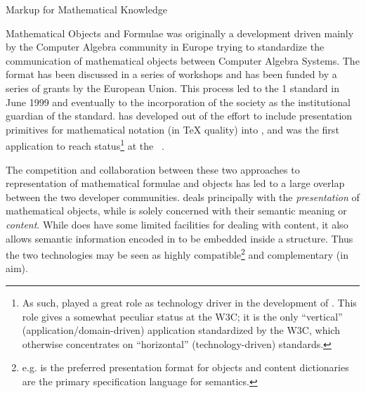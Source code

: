 \begin{tchapter}[id=math-markup]{Markup for Mathematical Knowledge}
\begin{tsection}[id=math-objects]{Mathematical Objects and Formulae}
    {\openmath} was originally a development driven mainly by the Computer Algebra
    community in Europe trying to standardize the communication of mathematical objects
    between Computer Algebra Systems. The format has been discussed in a series of
    workshops and has been funded by a series of grants by the European Union. This
    process led to the {\openmath} 1 standard in June 1999 and eventually to the
    incorporation of the {\openmath} society as the institutional guardian of the
    {\openmath} standard. {\mathml} has developed out of the effort to include
    presentation primitives for mathematical notation (in {\TeX}{}
    quality) into {\html}, and was the first {\xml} application to
    reach {} status\footnote{As such, {\mathml} played a great
      role as technology driver in the development of {\xml}. This role gives {\mathml} a
      somewhat peculiar status at the W3C; it is the only ``vertical''
      (application/domain-driven) {\xml} application standardized by the W3C, which
      otherwise concentrates on ``horizontal'' (technology-driven) standards.} at the
    {}~\cite{IonMin:MathML99}.
    
    The competition and collaboration between these two approaches to representation of
    mathematical formulae and objects has led to a large overlap between the two developer
    communities.  {\mathml} deals principally with the {\emph{presentation}} of
    mathematical objects, while {\openmath} is solely concerned with their semantic
    meaning or {\emph{content}}.  While {\mathml} does have some limited facilities for
    dealing with content, it also allows semantic information encoded in {\openmath} to be
    embedded inside a {\mathml} structure.  Thus the two technologies may be seen as
    highly compatible\footnote{e.g. {\mathml} is the preferred presentation format for
      {\openmath} objects and {\openmath} content dictionaries are the primary
      specification language for {\mathml} semantics.} and complementary (in aim).

\begin{tsubsection}[id=math-markup:mathml]{{\mathml}}
  \begin{center}
 \end{center}


\end{tsubsection}
\end{tsection}
\end{tchapter}
